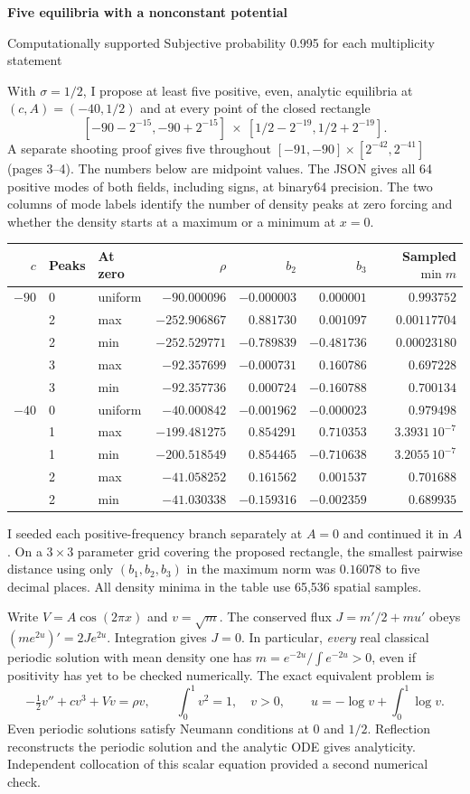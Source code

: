 \documentclass[11pt]{article}
\newcommand{\titleline}[1]{{\Large\bfseries\sffamily\color{ink}#1}\par}
\newcommand{\topic}[1]{\smallskip{\bfseries\sffamily\color{accent}#1}\par\nobreak}
\newcommand{\prob}[1]{{\small\sffamily\color{accent}#1}\par}
\begin{document}
\titleline{Five equilibria with a nonconstant potential}
\prob{Computationally supported \quad Subjective probability 0.995 for each multiplicity statement}
With $\sigma=1/2$, I propose at least five positive, even, analytic equilibria at
$(c,A)=(-40,1/2)$ and at every point of the closed rectangle
\[
[-90-2^{-15},-90+2^{-15}]\ \times\ [1/2-2^{-19},1/2+2^{-19}].
\]
A separate shooting proof gives five throughout $[-91,-90]\times[2^{-42},2^{-41}]$ (pages 3--4). The numbers below are midpoint values. The JSON gives all 64 positive modes of both fields, including signs, at binary64 precision. The two columns of mode labels identify the number of density peaks at zero forcing and whether the density starts at a maximum or a minimum at $x=0$.
\begin{center}\small
\begin{tabular}{@{}rllrrrr@{}}\toprule
$c$ & Peaks & At zero & $\rho$ & $b_2$ & $b_3$ & Sampled $\min m$\\\midrule
$-90$ &0& uniform & $-90.000096$ & $-0.000003$ & $0.000001$ & $0.993752$\\
&2& max & $-252.906867$ & $0.881730$ & $0.001097$ & $0.00117704$\\
&2& min & $-252.529771$ & $-0.789839$ & $-0.481736$ & $0.00023180$\\
&3& max & $-92.357699$ & $-0.000731$ & $0.160786$ & $0.697228$\\
&3& min & $-92.357736$ & $0.000724$ & $-0.160788$ & $0.700134$\\\midrule
$-40$ &0& uniform & $-40.000842$ & $-0.001962$ & $-0.000023$ & $0.979498$\\
&1& max & $-199.481275$ & $0.854291$ & $0.710353$ & $3.3931\,10^{-7}$\\
&1& min & $-200.518549$ & $0.854465$ & $-0.710638$ & $3.2055\,10^{-7}$\\
&2& max & $-41.058252$ & $0.161562$ & $0.001537$ & $0.701688$\\
&2& min & $-41.030338$ & $-0.159316$ & $-0.002359$ & $0.689935$\\\bottomrule
\end{tabular}\end{center}
I seeded each positive-frequency branch separately at $A=0$ and continued it in $A$. On a $3\times3$ parameter grid covering the proposed rectangle, the smallest pairwise distance using only $(b_1,b_2,b_3)$ in the maximum norm was $0.16078$ to five decimal places. All density minima in the table use 65,536 spatial samples.

\topic{From the game to a scalar boundary-value problem}
Write $V=A\cos(2\pi x)$ and $v=\sqrt m$. The conserved flux $J=m'/2+mu'$ obeys $(m e^{2u})'=2Je^{2u}$. Integration gives $J=0$. In particular, \emph{every} real classical periodic solution with mean density one has $m=e^{-2u}/\int e^{-2u}>0$, even if positivity has yet to be checked numerically. The exact equivalent problem is
\[
-\tfrac12 v''+cv^3+Vv=\rho v,\qquad \int_0^1v^2=1,\quad v>0,\qquad
u=-\log v+\int_0^1\log v .
\]
Even periodic solutions satisfy Neumann conditions at $0$ and $1/2$. Reflection reconstructs the periodic solution and the analytic ODE gives analyticity. Independent collocation of this scalar equation provided a second numerical check.
\end{document}
